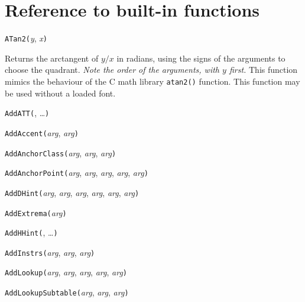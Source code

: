 \chapter{Reference to built-in functions}


\noindent\texttt{ATan2(}\textit{y}, \textit{x}\texttt{)}

Returns the arctangent of $y/x$ in radians, using the signs of the arguments
to choose the quadrant.  \emph{Note the order of the arguments, with $y$
first.}  This function mimics the behaviour of the C math library
\texttt{atan2()} function.  This function may be used without a
loaded font.


\noindent\texttt{AddATT(}, \ldots\texttt{)}


\noindent\texttt{AddAccent(}\textit{arg}, \textit{arg}\texttt{)}


\noindent\texttt{AddAnchorClass(}\textit{arg}, \textit{arg}, \textit{arg}\texttt{)}


\noindent\texttt{AddAnchorPoint(}\textit{arg}, \textit{arg}, \textit{arg}, \textit{arg}, \textit{arg}\texttt{)}


\noindent\texttt{AddDHint(}\textit{arg}, \textit{arg}, \textit{arg}, \textit{arg}, \textit{arg}, \textit{arg}\texttt{)}


\noindent\texttt{AddExtrema(}\textit{arg}\texttt{)}


\noindent\texttt{AddHHint(}, \ldots\texttt{)}


\noindent\texttt{AddInstrs(}\textit{arg}, \textit{arg}, \textit{arg}\texttt{)}


\noindent\texttt{AddLookup(}\textit{arg}, \textit{arg}, \textit{arg}, \textit{arg}, \textit{arg}\texttt{)}


\noindent\texttt{AddLookupSubtable(}\textit{arg}, \textit{arg}, \textit{arg}\texttt{)}


